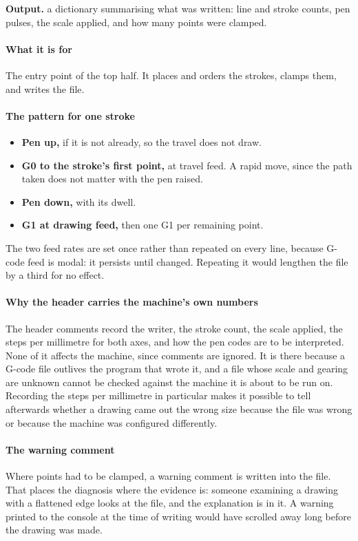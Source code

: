 \noindent\textbf{Output.} a dictionary summarising what was written: line and stroke counts, pen pulses, the scale applied, and how many points were clamped.


\paragraph{What it is for}
The entry point of the top half. It places and orders the strokes, clamps them, and writes the file.


\paragraph{The pattern for one stroke}

\begin{itemize}\setlength\itemsep{0pt}
  \item \textbf{Pen up,} if it is not already, so the travel does not draw.
  \item \textbf{G0 to the stroke's first point,} at travel feed. A rapid move, since the path taken does not matter with the pen raised.
  \item \textbf{Pen down,} with its dwell.
  \item \textbf{G1 at drawing feed,} then one G1 per remaining point.
\end{itemize}
The two feed rates are set once rather than repeated on every line, because G-code feed is modal: it persists until changed. Repeating it would lengthen the file by a third for no effect.


\paragraph{Why the header carries the machine's own numbers}
The header comments record the writer, the stroke count, the scale applied, the steps per millimetre for both axes, and how the pen codes are to be interpreted. None of it affects the machine, since comments are ignored. It is there because a G-code file outlives the program that wrote it, and a file whose scale and gearing are unknown cannot be checked against the machine it is about to be run on. Recording the steps per millimetre in particular makes it possible to tell afterwards whether a drawing came out the wrong size because the file was wrong or because the machine was configured differently.


\paragraph{The warning comment}
Where points had to be clamped, a warning comment is written into the file. That places the diagnosis where the evidence is: someone examining a drawing with a flattened edge looks at the file, and the explanation is in it. A warning printed to the console at the time of writing would have scrolled away long before the drawing was made.



